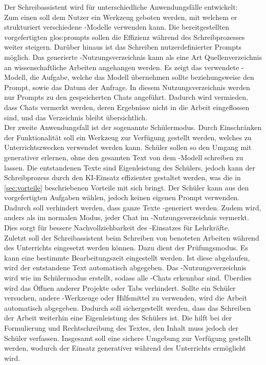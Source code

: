 \documentclass[../main.tex]{subfiles}
\begin{document}
Der Schreibassistent wird für unterschiedliche Anwendungsfälle entwickelt: \\
 Zum einen soll dem Nutzer ein Werkzeug geboten werden, mit welchem er strukturiert verschiedene -Modelle verwenden kann. Die bereitgestellten vorgefertigten \gls{glos:prompt}s sollen 
 die Effizienz während des Schreibprozesses weiter steigern. Darüber hinaus ist das Schreiben nutzerdefinierter Prompts möglich. Das generierte -Nutzungsverzeichnis kann als eine 
 Art Quellenverzeichnis an wissenschaftliche Arbeiten angehangen werden. Es zeigt das verwendete -Modell, die Aufgabe, welche das Modell übernehmen sollte 
 beziehungsweise den Prompt, sowie das Datum der Anfrage. In diesem Nutzungsverzeichnis werden nur Prompts zu den gespeicherten Chats angeführt. Dadurch wird vermieden, dass Chats 
 vermerkt werden, deren Ergebnisse nicht in die Arbeit eingeflossen sind, und das Verzeichnis bleibt übersichtlich.\\ 
 Der zweite Anwendungsfall ist der sogenannte Schülermodus. Durch 
 Einschränken der Funktionalität soll ein Werkzeug zur Verfügung gestellt werden, welches zu Unterrichtszwecken verwendet werden kann. Schüler sollen so den Umgang mit generativer 
  erlernen, ohne den gesamten Text von dem -Modell schreiben zu lassen. Die entstandenen Texte sind Eigenleistung des Schülers, jedoch kann der 
 Schreibprozess durch den KI-Einsatz effizienter gestaltet werden, was die in \autoref{sec:vorteile} beschriebenen Vorteile mit sich bringt. Der Schüler kann aus den vorgefertigten Aufgaben 
 wählen, jedoch keinen eigenen Prompt verwenden. Dadurch soll verhindert werden, dass ganze Texte -generiert werden. Zudem wird, anders als im normalen Modus, jeder 
 Chat im -Nutzungsverzeichnis vermerkt. Dies sorgt für bessere Nachvollziehbarkeit des -Einsatzes für Lehrkräfte.\\ 
 Zuletzt soll der Schreibassistent 
 beim Schreiben von benoteten Arbeiten während des Unterrichts eingesetzt werden können. Dazu dient der Prüfungsmodus. Es kann eine bestimmte Bearbeitungszeit eingestellt werden. 
 Ist diese abgelaufen, wird der entstandene Text automatisch abgegeben. Das -Nutzungsverzeichnis wird wie im Schülermodus erstellt, sodass alle -Chats 
 erkennbar sind. Überdies  wird das Öffnen anderer Projekte oder Tabs verhindert. Sollte ein Schüler versuchen, andere -Werkzeuge oder Hilfsmittel zu verwenden, 
 wird die Arbeit automatisch abgegeben. Dadurch soll sichergestellt werden, dass das Schreiben der Arbeit weiterhin eine Eigenleistung des Schülers ist. Die  hilft 
 bei der Formulierung und Rechtschreibung des Textes, den Inhalt muss jedoch der Schüler verfassen. Insgesamt soll eine sichere Umgebung zur Verfügung gestellt werden, wodurch der Einsatz 
 generativer  während des Unterrichts ermöglicht wird.
\end{document}

